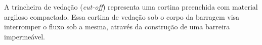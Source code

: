 \item A trincheira de vedação (\textit{cut-off}) representa uma cortina preenchida com material argiloso compactado. Essa cortina de vedação sob o corpo da barragem visa interromper o fluxo sob a mesma, através da construção de uma barreira impermeável. 